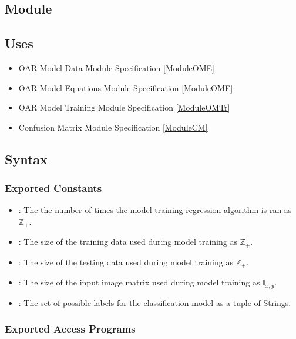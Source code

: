 \documentclass[12pt, titlepage]{article}
\begin{document}
\subsection{Module}


\subsection{Uses}

\begin{itemize}
  \item OAR Model Data Module Specification \ref{ModuleOME}
  \item OAR Model Equations Module Specification \ref{ModuleOME}
  \item OAR Model Training Module Specification \ref{ModuleOMTr}
  \item Confusion Matrix Module Specification \ref{ModuleCM}
\end{itemize}

\subsection{Syntax}

\subsubsection{Exported Constants}

\begin{itemize}
\item {}: The the number of times the model training regression algorithm is ran as $\mathbb{Z}_{+}$.
\item {}: The size of the training data used during model training as $\mathbb{Z}_{+}$.
\item {}: The size of the testing data used during model training as $\mathbb{Z}_{+}$.
\item {}: The size of the input image matrix used during model training as $\mathbb{I}_{x, y}$.
\item {}: The set of possible labels for the classification model as a tuple of Strings.
\end{itemize}

\subsubsection{Exported Access Programs}
\end{document}
